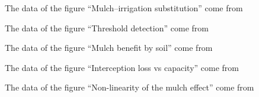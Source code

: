 \begin{exlist}
\item The data of the figure ``Mulch--irrigation substitution'' come from
\item The data of the figure ``Threshold detection'' come from
\item The data of the figure ``Mulch benefit by soil'' come from
\item The data of the figure ``Interception loss vs capacity'' come from
\item The data of the figure ``Non-linearity of the mulch effect'' come from
\end{exlist}
